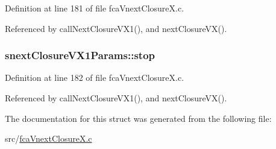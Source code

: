 \-Definition at line 181 of file fca\-Vnext\-Closure\-X.\-c.



\-Referenced by call\-Next\-Closure\-V\-X1(), and next\-Closure\-V\-X().

\hypertarget{structsnextClosureVX1Params_a4ebb2a834d87fa4bed2bb7597ac29d23}{
\subsubsection[{stop}]{ {\bf snext\-Closure\-V\-X1\-Params\-::stop}}}\label{structsnextClosureVX1Params_a4ebb2a834d87fa4bed2bb7597ac29d23}


\-Definition at line 182 of file fca\-Vnext\-Closure\-X.\-c.



\-Referenced by call\-Next\-Closure\-V\-X1(), and next\-Closure\-V\-X().



\-The documentation for this struct was generated from the following file\-:\begin{DoxyCompactItemize}
\item 
src/\hyperlink{fcaVnextClosureX_8c}{fca\-Vnext\-Closure\-X.\-c}\end{DoxyCompactItemize}
